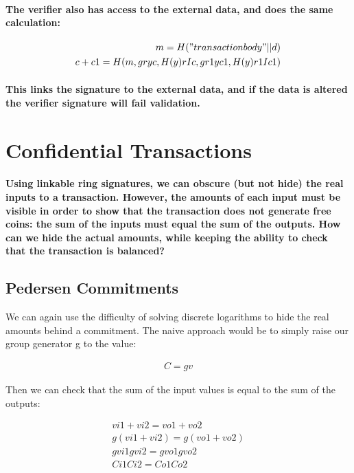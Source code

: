 \documentclass{article}
\begin{document}
\paragraph{The verifier also has access to the external data, and does the same calculation:}

\begin{eqnarray}
  m = H("transaction body" || d)\\
  c+c1=H(m, gryc, H(y)rIc, gr1yc1, H(y)r1Ic1)
\end{eqnarray}

\paragraph{This links the signature to the external data, and if the data is altered the verifier signature will fail validation.}

\section{Confidential Transactions}

\paragraph{Using linkable ring signatures, we can obscure (but not hide) the real inputs to a transaction.  However, the amounts of each input must be visible in order to show that the transaction does not generate free coins: the sum of the inputs must equal the sum of the outputs.  How can we hide the actual amounts, while keeping the ability to check that the transaction is balanced?}


\subsection{Pedersen Commitments}

We can again use the difficulty of solving discrete logarithms to hide the real amounts behind a commitment.  The naive approach would be to simply raise our group generator g to the value:

\begin{eqnarray}
  C=gv
\end{eqnarray}

Then we can check that the sum of the input values is equal to the sum of the outputs:

\begin{eqnarray}
  vi1+vi2=vo1+vo2\\
  g(vi1+vi2)=g(vo1+vo2)\\
  gvi1gvi2=gvo1gvo2\\
  Ci1Ci2=Co1Co2
\end{eqnarray}
  
\end{document}

